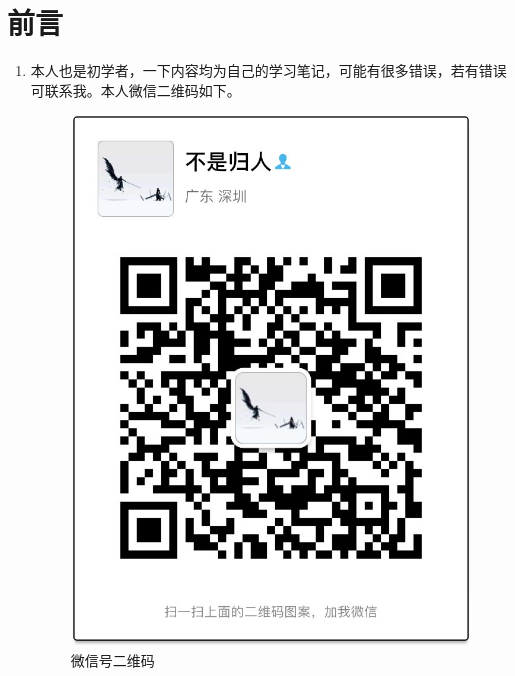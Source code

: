 \section{前言}
\begin{enumerate}
	\item 本人也是初学者，一下内容均为自己的学习笔记，可能有很多错误，若有错误可联系我。本人微信二维码如下。
	\begin{figure}[htbp]
		\centering
		\includegraphics[scale=0.3]{images/微信号二维码}
		\caption{微信号二维码}
	\end{figure}
\end{enumerate}



























